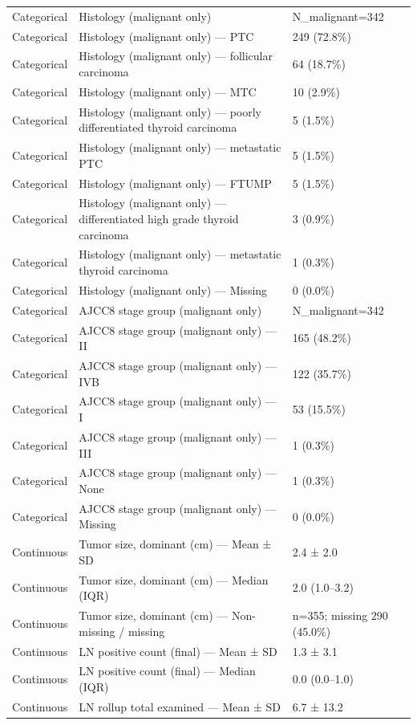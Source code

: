 \begin{table}[htbp]
\begin{tabular}{lll}
Categorical & Histology (malignant only) & N\_malignant=342 \\
Categorical & Histology (malignant only) — PTC & 249 (72.8\%) \\
Categorical & Histology (malignant only) — follicular carcinoma & 64 (18.7\%) \\
Categorical & Histology (malignant only) — MTC & 10 (2.9\%) \\
Categorical & Histology (malignant only) — poorly differentiated thyroid carcinoma & 5 (1.5\%) \\
Categorical & Histology (malignant only) — metastatic PTC & 5 (1.5\%) \\
Categorical & Histology (malignant only) — FTUMP & 5 (1.5\%) \\
Categorical & Histology (malignant only) — differentiated high grade thyroid carcinoma & 3 (0.9\%) \\
Categorical & Histology (malignant only) — metastatic thyroid carcinoma & 1 (0.3\%) \\
Categorical & Histology (malignant only) — Missing & 0 (0.0\%) \\
Categorical & AJCC8 stage group (malignant only) & N\_malignant=342 \\
Categorical & AJCC8 stage group (malignant only) — II & 165 (48.2\%) \\
Categorical & AJCC8 stage group (malignant only) — IVB & 122 (35.7\%) \\
Categorical & AJCC8 stage group (malignant only) — I & 53 (15.5\%) \\
Categorical & AJCC8 stage group (malignant only) — III & 1 (0.3\%) \\
Categorical & AJCC8 stage group (malignant only) — None & 1 (0.3\%) \\
Categorical & AJCC8 stage group (malignant only) — Missing & 0 (0.0\%) \\
Continuous & Tumor size, dominant (cm) — Mean ± SD & 2.4 ± 2.0 \\
Continuous & Tumor size, dominant (cm) — Median (IQR) & 2.0 (1.0–3.2) \\
Continuous & Tumor size, dominant (cm) — Non-missing / missing & n=355; missing 290 (45.0\%) \\
Continuous & LN positive count (final) — Mean ± SD & 1.3 ± 3.1 \\
Continuous & LN positive count (final) — Median (IQR) & 0.0 (0.0–1.0) \\
Continuous & LN rollup total examined — Mean ± SD & 6.7 ± 13.2 \\

\end{tabular}
\end{table}
